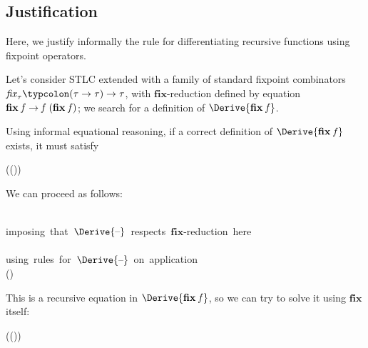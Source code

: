 \subsection{Justification}
Here, we justify informally the rule for differentiating recursive functions
using fixpoint operators.

Let's consider STLC extended with a family of standard fixpoint
combinators $\Varid{fix}_{\ensuremath{\tau}}\ensuremath{\typcolon(\tau\to \tau)\to \tau}$, with
\ensuremath{\mathbf{fix}}-reduction defined by equation \ensuremath{\mathbf{fix}\;\Varid{f}\to \Varid{f}\;(\mathbf{fix}\;\Varid{f})}; we
search for a definition of \ensuremath{\Derive{\mathbf{fix}\;\Varid{f}}}.

Using informal equational reasoning, if a correct definition of
\ensuremath{\Derive{\mathbf{fix}\;\Varid{f}}} exists, it must satisfy
\begin{hscode}\SaveRestoreHook
{}%
%
%
\>[3]{}\cong{}\;(\;(\;)){}\<[E]%
\ColumnHook
\end{hscode}\resethooks

We can proceed as follows:
\begin{equational}
\begin{hscode}\SaveRestoreHook
{}%
%
%
%
\>[4]{}\<[E]%
\\
\>[B]{}\mathrel{=}{}\<[BE]%
\>[4]{}\mbox{\commentbegin  imposing that \ensuremath{\Derive{\text{\textendash}}} respects \ensuremath{\mathbf{fix}}-reduction here  \commentend}{}\<[E]%
\\
\>[4]{}\<[E]%
\\
\>[B]{}\mathrel{=}{}\<[BE]%
\>[4]{}\mbox{\commentbegin  using rules for \ensuremath{\Derive{\text{\textendash}}} on application  \commentend}{}\<[E]%
\\
\>[4]{}\;(\;)\;\<[E]%
\ColumnHook
\end{hscode}\resethooks
\end{equational}

This is a recursive equation in \ensuremath{\Derive{\mathbf{fix}\;\Varid{f}}}, so we can try
to solve it using \ensuremath{\mathbf{fix}} itself:
\begin{hscode}\SaveRestoreHook
{}%
%
%
\>[3]{}\mathrel{=}\;(\lambda {}\to {}\;(\;)\;){}\<[E]%
\ColumnHook
\end{hscode}\resethooks

